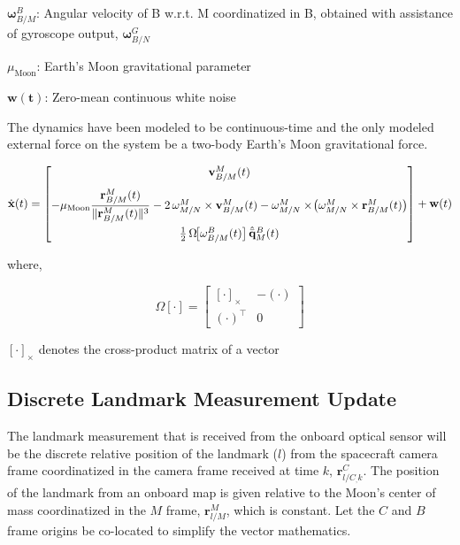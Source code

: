 \documentclass[conf]{new-aiaa}
\newcommand{\vect}[1]{\mathbf{#1}}
\newcommand{\rBM}{\vect{r}^M_{B/M}}      %
\newcommand{\vBM}{\vect{v}^M_{B/M}}      %
\newcommand{\qBM}{\hat{\Bar{\mathbf{q}}}^B_{M}}    %
\newcommand{\wMN}{\vect{\omega}^M_{M/N}}
\newcommand{\wBM}{\vect{\omega}^B_{B/M}}
\newcommand{\wGryoOut}{\vect{\omega}^G_{B/N}}
\newcommand{\rlO}{\vect{r}^M_{l/M}}
\newcommand{\rlBmeas}{\vect{r}^C_{l/C_,k}}
\begin{document}
$\wBM$: Angular velocity of B w.r.t. M coordinatized in B, obtained with assistance of gyroscope output, $\wGryoOut$

$\mu_{\mathrm{Moon}}$: Earth's Moon gravitational parameter

$\vect{w(t)}$: Zero-mean continuous white noise



\vspace{10pt}
The dynamics have been modeled to be continuous-time and the only modeled external force on the system be a two-body Earth's Moon gravitational force.





\begin{equation}
\dot{\vect{x}}(t) =
\begin{bmatrix}
\vBM(t) \\[8pt]
-\mu_{\mathrm{Moon}} \dfrac{\rBM(t)}{\|\rBM(t)\|^3}
- 2\,\wMN \times \vBM(t)
- \wMN \times \!\big( \wMN \times \rBM(t) \big) \\[12pt]
\tfrac{1}{2}\,\Omega\!\big[\wBM(t)\big]\,\qBM(t)
\end{bmatrix}
+ \vect{w}(t)
\label{eq:StateDynamicsModel}
\end{equation}


where,

\begin{equation}
\Omega[\cdot] =
\begin{bmatrix}
[\cdot]_\times & -(\cdot) \\[6pt]
(\cdot)^\top & 0
\end{bmatrix}
\label{eq:BIGOmegaQuatID}
\end{equation}

\begin{center}
$[\cdot]_\times$ denotes the cross-product matrix of a vector    
\end{center}






\subsection{Discrete Landmark Measurement Update}
 The landmark measurement that is received from the onboard optical sensor will be the discrete relative position of the landmark ($l$) from the spacecraft camera frame coordinatized in the camera frame received at time $k$, $\rlBmeas$. The position of the landmark from an onboard map is given relative to the Moon's center of mass coordinatized in the $M$ frame, $\rlO$, which is constant. Let the $C$ and $B$ frame origins be co-located to simplify the vector mathematics. 
\end{document}
